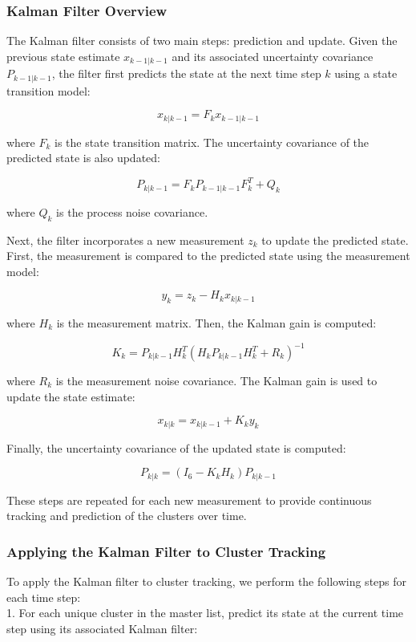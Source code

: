 \documentclass[journal]{IEEEtran} %
\begin{document}
\subsubsection{Kalman Filter Overview}

The Kalman filter consists of two main steps: prediction and update. Given the previous state estimate $x_{k-1|k-1}$ and its associated uncertainty covariance $P_{k-1|k-1}$, the filter first predicts the state at the next time step $k$ using a state transition model:

\[
x_{k|k-1} = F_k x_{k-1|k-1}
\]

where $F_k$ is the state transition matrix. The uncertainty covariance of the predicted state is also updated:

\[
P_{k|k-1} = F_k P_{k-1|k-1} F_k^T + Q_k
\]

where $Q_k$ is the process noise covariance.

Next, the filter incorporates a new measurement $z_k$ to update the predicted state. First, the measurement is compared to the predicted state using the measurement model:

\[
y_k = z_k - H_k x_{k|k-1}
\]

where $H_k$ is the measurement matrix. Then, the Kalman gain is computed:

\[
K_k = P_{k|k-1} H_k^T (H_k P_{k|k-1} H_k^T + R_k)^{-1}
\]

where $R_k$ is the measurement noise covariance. The Kalman gain is used to update the state estimate:

\[
x_{k|k} = x_{k|k-1} + K_k y_k
\]

Finally, the uncertainty covariance of the updated state is computed:

\[
P_{k|k} = (I_6 - K_k H_k) P_{k|k-1}
\]

These steps are repeated for each new measurement to provide continuous tracking and prediction of the clusters over time.\\

\subsubsection{Applying the Kalman Filter to Cluster Tracking}

To apply the Kalman filter to cluster tracking, we perform the following steps for each time step:\\

1. For each unique cluster in the master list, predict its state at the current time step using its associated Kalman filter:
\end{document}
